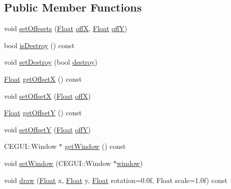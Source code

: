 \subsection*{Public Member Functions}
\begin{DoxyCompactItemize}
\item 
void \hyperlink{classZeta_1_1CEGUIChild_a8aeee04fbae4f660078cbd8e2971e6c9}{set\+Offesets} (\hyperlink{namespaceZeta_a1e0a1265f9b3bd3075fb0fabd39088ba}{Float} \hyperlink{classZeta_1_1CEGUIChild_ab310788932185a4617ad278b5c2191d4}{off\+X}, \hyperlink{namespaceZeta_a1e0a1265f9b3bd3075fb0fabd39088ba}{Float} \hyperlink{classZeta_1_1CEGUIChild_ad4f34c974859b029a4ccea381ba23fae}{off\+Y})
\item 
bool \hyperlink{classZeta_1_1CEGUIChild_a243ff48679f52fd5be232d18ccc7501e}{is\+Destroy} () const 
\item 
void \hyperlink{classZeta_1_1CEGUIChild_a0904a4c41359797e5b5199545fe7b8d2}{set\+Destroy} (bool \hyperlink{classZeta_1_1CEGUIChild_a048b0e5733cbe3e069a3f1e7787aa3c9}{destroy})
\item 
\hyperlink{namespaceZeta_a1e0a1265f9b3bd3075fb0fabd39088ba}{Float} \hyperlink{classZeta_1_1CEGUIChild_aa5956c4e7689160fa4c3ff84d237b99d}{get\+Offset\+X} () const 
\item 
void \hyperlink{classZeta_1_1CEGUIChild_a0c4d07d37fb49e719f6cb9adc4b43a06}{set\+Offset\+X} (\hyperlink{namespaceZeta_a1e0a1265f9b3bd3075fb0fabd39088ba}{Float} \hyperlink{classZeta_1_1CEGUIChild_ab310788932185a4617ad278b5c2191d4}{off\+X})
\item 
\hyperlink{namespaceZeta_a1e0a1265f9b3bd3075fb0fabd39088ba}{Float} \hyperlink{classZeta_1_1CEGUIChild_ab655630496f7d89b2333c3d3dfc383bf}{get\+Offset\+Y} () const 
\item 
void \hyperlink{classZeta_1_1CEGUIChild_aae430c63cdc33aabdc07e070262c69bd}{set\+Offset\+Y} (\hyperlink{namespaceZeta_a1e0a1265f9b3bd3075fb0fabd39088ba}{Float} \hyperlink{classZeta_1_1CEGUIChild_ad4f34c974859b029a4ccea381ba23fae}{off\+Y})
\item 
C\+E\+G\+U\+I\+::\+Window $\ast$ \hyperlink{classZeta_1_1CEGUIChild_a4364c2dade6defabac10c8c2aac29a5e}{get\+Window} () const 
\item 
void \hyperlink{classZeta_1_1CEGUIChild_afed50afc0941b6ad0db81dd0d65f8504}{set\+Window} (C\+E\+G\+U\+I\+::\+Window $\ast$\hyperlink{classZeta_1_1CEGUIChild_a613512ccdd6b324a8a15e063b6a56fdd}{window})
\item 
void \hyperlink{classZeta_1_1CEGUIChild_a46f89f7ef921246d22690d7e1900da35}{draw} (\hyperlink{namespaceZeta_a1e0a1265f9b3bd3075fb0fabd39088ba}{Float} x, \hyperlink{namespaceZeta_a1e0a1265f9b3bd3075fb0fabd39088ba}{Float} y, \hyperlink{namespaceZeta_a1e0a1265f9b3bd3075fb0fabd39088ba}{Float} rotation=0.\+0f, Float scale=1.\+0f) const 

\end{DoxyCompactItemize}
